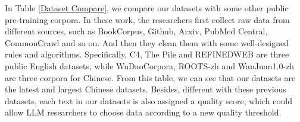 \documentclass{article}
\begin{document}





 




In Table \ref{Dataset Compare}, we compare our datasets with some other public pre-training corpora. In these work, the researchers first collect raw data from different sources, such as BookCorpus, Github, Arxiv, PubMed Central, CommonCrawl and so on. And then they clean them with some well-designed rules and algorithms. Specifically, C4\cite{2020T5C4}, The Pile\cite{2020_pile} and REFINEDWEB\cite{2023refinedweb} are three public English datasets, while WuDaoCorpora\cite{2021WuDaoCorpora}, ROOTS-zh\cite{2023roots} and WanJuan1.0-zh\cite{2023wanjuan} are three corpora for Chinese. From this table, we can see that our datasets are the latest and largest Chinese datasets. Besides, different with these previous datasets, each text in our datasets is also assigned a quality score, which could allow LLM researchers to choose data according to a new quality threshold.



\end{document}
